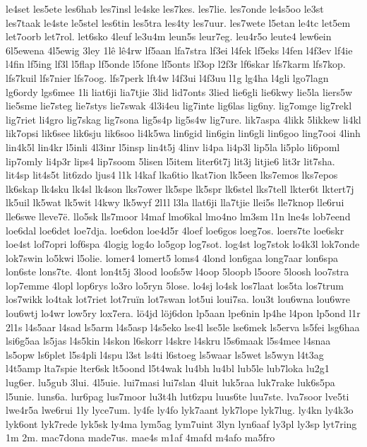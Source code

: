 {le4set
les5ete
les6hab
les7insl
le4ske
les7kes.
les7lie.
les7onde
le4s5oo
le3st
les7taak
le4ste
le5stel
les6tin
les5tra
les4ty
les7uur.
les7wete
l5etan
le4tc
let5em
let7oorb
let7rol.
let6sko
4leuf
le3u4m
leun5s
leur7eg.
leu4r5o
leute4
lew6ein
6l5ewena
4l5ewig
3ley
1lê
lê4rw
lf5aan
lfa7stra
lf3ei
l4fek
lf5eks
l4fen
l4f3ev
lf4ie
l4fin
lf5ing
lf3l
l5flap
lf5onde
l5fone
lf5onts
lf3op
l2f3r
lf6skar
lfs7karm
lfs7kop.
lfs7kuil
lfs7nier
lfs7oog.
lfs7perk
lft4w
l4f3ui
l4f3uu
l1g
lg4ha
l4gli
lgo7lagn
lg6ordy
lgs6mee
1li
liat6ji
lia7tjie
3lid
lid7onts
3lied
lie6gli
lie6kwy
lie5la
liers5w
lie5sme
lie7steg
lie7stys
lie7swak
4l3i4eu
lig7inte
lig6las
lig6ny.
lig7omge
lig7rekl
lig7riet
li4gro
lig7skag
lig7sona
lig5s4p
lig5s4w
lig7ure.
lik7aspa
4likk
5likkew
li4kl
lik7opsi
lik6see
lik6sju
lik6soo
li4k5wa
lin6gid
lin6gin
lin6gli
lin6goo
ling7ooi
4linh
lin4k5l
lin4kr
l5inli
4l3inr
l5insp
lin4t5j
4linv
li4pa
li4p3l
lip5la
li5plo
li6poml
lip7omly
li4p3r
lips4
lip7soom
5lisen
l5item
liter6t7j
lit3j
litjie6
lit3r
lit7sha.
lit4sp
lit4s5t
lit6zdo
ljus4
l1k
l4kaf
lka6tio
lkat7ion
lk5een
lks7emos
lks7epos
lk6skap
lk4sku
lk4sl
lk4son
lks7ower
lk5spe
lk5spr
lk6stel
lks7tell
lkter6t
lktert7j
lk5uil
lk5wat
lk5wit
l4kwy
lk5wyf
2l1l
l3la
llat6ji
lla7tjie
llei5s
lle7knop
lle6rui
lle6swe
lleve7ë.
llo5sk
lls7moor
l4maf
lmo6kal
lmo4no
lm3sm
l1n
lne4s
lob7eend
loe6dal
loe6det
loe7dja.
loe6don
loe4d5r
4loef
loe6gos
loeg7os.
loers7te
loe6skr
loe4st
lof7opri
lof6spa
4logig
log4o
lo5gop
log7sot.
log4st
log7stok
lo4k3l
lok7onde
lok7swin
lo5kwi
l5olie.
lomer4
lomert5
loms4
4lond
lon6gaa
long7aar
lon6spa
lon6ste
lons7te.
4lont
lon4t5j
3lood
loofs5w
l4oop
5loopb
l5oore
5loosh
loo7stra
lop7emme
4lopl
lop6rys
lo3ro
lo5ryn
5lose.
lo4sj
lo4sk
los7laat
los5ta
los7trum
los7wikk
lo4tak
lot7riet
lot7ruïn
lot7swan
lot5ui
loui7sa.
lou3t
lou6wna
lou6wre
lou6wtj
lo4wr
low5ry
lox7era.
lö4jd
löj6don
lp5aan
lpe6nin
lp4he
l4pon
lp5ond
l1r
2l1s
l4s5aar
l4sad
ls5arm
l4s5asp
l4s5eko
lse4l
lse5le
lse6mek
ls5erva
ls5fei
lsg6haa
lsi6g5aa
ls5jas
l4s5kin
l4skon
l6skorr
l4skre
l4skru
l5s6maak
l5s4mee
l4snaa
ls5opw
ls6plet
l5s4pli
l4spu
l3st
ls4ti
l6stoeg
ls5waar
ls5wet
ls5wyn
l4t3ag
l4t5amp
lta7spie
lter6sk
lt5oond
l5t4wak
lu4bh
lu4bl
lub5le
lub7loka
lu2g1
lug6er.
lu5gub
3lui.
4l5uie.
lui7masi
lui7slan
4luit
luk5raa
luk7rake
luk6s5pa
l5unie.
luns6a.
lur6pag
lus7moor
lu3t4h
lut6zpu
luus6te
luu7ste.
lva7soor
lve5ti
lwe4r5a
lwe6rui
1ly
lyce7um.
ly4fe
ly4fo
lyk7aant
lyk7lope
lyk7lug.
ly4kn
ly4k3o
lyk6ont
lyk7rede
lyk5sk
ly4ma
lym5ag
lym7uint
3lyn
lyn6aaf
ly3pl
ly3sp
lyt7ring
1m
2m.
mac7dona
made7us.
mae4s
m1af
4mafd
m4afo
ma5fro
}
